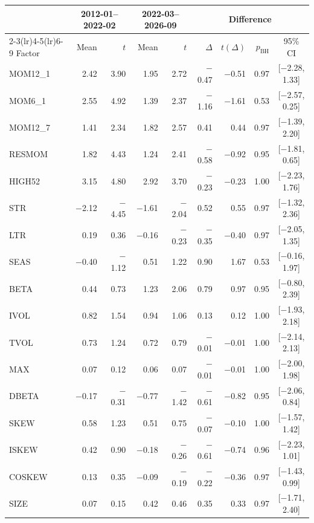 \begin{tabular}{l rr rr rrrc}
\toprule
 & \multicolumn{2}{c}{2012-01--2022-02} & \multicolumn{2}{c}{2022-03--2026-09} & \multicolumn{4}{c}{Difference} \\
\cmidrule(lr){2-3}\cmidrule(lr){4-5}\cmidrule(lr){6-9}
Factor & Mean & $t$ & Mean & $t$ & $\Delta$ & $t(\Delta)$ & $p_{\text{BH}}$ & 95\% CI \\
\midrule
MOM12\_1 & 2.42 & 3.90 & 1.95 & 2.72 & $-$0.47 & $-$0.51 & 0.97 & [$-$2.28, 1.33] \\
MOM6\_1 & 2.55 & 4.92 & 1.39 & 2.37 & $-$1.16 & $-$1.61 & 0.53 & [$-$2.57, 0.25] \\
MOM12\_7 & 1.41 & 2.34 & 1.82 & 2.57 & 0.41 & 0.44 & 0.97 & [$-$1.39, 2.20] \\
RESMOM & 1.82 & 4.43 & 1.24 & 2.41 & $-$0.58 & $-$0.92 & 0.95 & [$-$1.81, 0.65] \\
HIGH52 & 3.15 & 4.80 & 2.92 & 3.70 & $-$0.23 & $-$0.23 & 1.00 & [$-$2.23, 1.76] \\
\addlinespace[2pt]
STR & $-$2.12 & $-$4.45 & $-$1.61 & $-$2.04 & 0.52 & 0.55 & 0.97 & [$-$1.32, 2.36] \\
LTR & 0.19 & 0.36 & $-$0.16 & $-$0.23 & $-$0.35 & $-$0.40 & 0.97 & [$-$2.05, 1.35] \\
\addlinespace[2pt]
SEAS & $-$0.40 & $-$1.12 & 0.51 & 1.22 & 0.90 & 1.67 & 0.53 & [$-$0.16, 1.97] \\
\addlinespace[2pt]
BETA & 0.44 & 0.73 & 1.23 & 2.06 & 0.79 & 0.97 & 0.95 & [$-$0.80, 2.39] \\
IVOL & 0.82 & 1.54 & 0.94 & 1.06 & 0.13 & 0.12 & 1.00 & [$-$1.93, 2.18] \\
TVOL & 0.73 & 1.24 & 0.72 & 0.79 & $-$0.01 & $-$0.01 & 1.00 & [$-$2.14, 2.13] \\
MAX & 0.07 & 0.12 & 0.06 & 0.07 & $-$0.01 & $-$0.01 & 1.00 & [$-$2.00, 1.98] \\
\addlinespace[2pt]
DBETA & $-$0.17 & $-$0.31 & $-$0.77 & $-$1.42 & $-$0.61 & $-$0.82 & 0.95 & [$-$2.06, 0.84] \\
SKEW & 0.58 & 1.23 & 0.51 & 0.75 & $-$0.07 & $-$0.10 & 1.00 & [$-$1.57, 1.42] \\
ISKEW & 0.42 & 0.90 & $-$0.18 & $-$0.26 & $-$0.61 & $-$0.74 & 0.96 & [$-$2.23, 1.01] \\
COSKEW & 0.13 & 0.35 & $-$0.09 & $-$0.19 & $-$0.22 & $-$0.36 & 0.97 & [$-$1.43, 0.99] \\
\addlinespace[2pt]
SIZE & 0.07 & 0.15 & 0.42 & 0.46 & 0.35 & 0.33 & 0.97 & [$-$1.71, 2.40] \\

\end{tabular}
